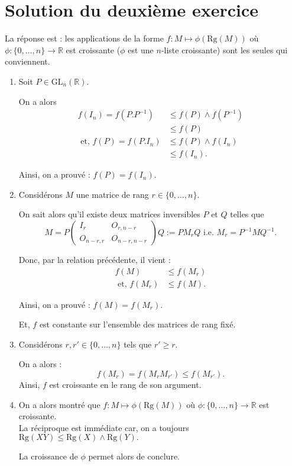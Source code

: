  

\section{Solution du deuxième exercice}
 
La réponse est : les applications de la forme $f: \displaystyle M\mapsto \phi(\mbox{Rg}(M))$ où $\displaystyle \phi : \{0,\ldots,n\}\rightarrow \mathbb{R}$ est croissante ($\phi$ est une $n$-liste croissante) sont les seules qui conviennent.

\begin{enumerate}
\item Soit $P\in \mbox{GL}_{n}(\mathbb{R}).$

On a  alors 
\begin{align*}
f(I_{n})=f(P.P^{-1}) & \leq f(P)\wedge f(P^{-1})\\
& \leq f(P)\\
\mbox{ et, } f(P)=f(P.I_{n})& \leq f(P)\wedge f(I_{n})\\
& \leq f(I_{n}).
\end{align*}

Ainsi, on a prouvé : $\displaystyle f(P)=f(I_{n}).$

\item Considérons $M$ une matrice de rang $r\in \{0,\ldots,n\}.$

On sait alors qu'il existe deux matrices inversibles $P$ et $Q$ telles que  $$M=P\left( \begin{array}{ll}
I_{r} & O_{r,n-r}\\
O_{n-r,r} & O_{n-r,n-r}
\end{array}
\right) Q:=PM_{r}Q \mbox{ i.e. } M_{r}=P^{-1}MQ^{-1}.$$

Donc, par la relation précédente, il vient : 
\begin{align*}
f(M) & \leq f(M_{r})\\
\mbox{ et, } f(M_{r}) & \leq f(M).
\end{align*}

Ainsi, on a prouvé : $\displaystyle f(M)=f(M_{r}).$

Et, $f$ est constante sur l'ensemble des matrices de rang fixé.

\item Considérons $r,r'\in \{0,\ldots,n\}$ tels que $r'\geq r.$

On a alors : $$f(M_{r})=f(M_{r}M_{r'})\leq f(M_{r'}).$$
Ainsi, $f$ est croissante en le rang de son argument.
\item On a alors montré que $f: \displaystyle M\mapsto \phi(\mbox{Rg}(M))$ où $\displaystyle \phi : \{0,\ldots,n\}\rightarrow \mathbb{R}$ est croissante.\\ 

La réciproque est immédiate car, on a toujours $\displaystyle \mbox{Rg}(XY)\leq \mbox{Rg}(X)\wedge\mbox{Rg}(Y).$ 

La croissance de $\phi$ permet alors de conclure.
\end{enumerate}



